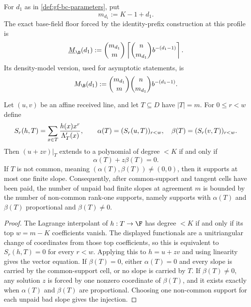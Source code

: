 \begin{definition}
\label{def:gf-bc-base-floor}
For \(d_1\) as in \cref{def:gf-bc-parameters}, put
\[
        m_{d_1}:=K-1+d_1 .
\]
The exact base-field floor forced by the identity-prefix construction at this
profile is
\[
        \underline M_{\B}(d_1)
        :=
        \binom{m_{d_1}}m
        \left\lceil \binom n{m_{d_1}} b^{-(d_1-1)}\right\rceil .
\]
Its density-model version, used for asymptotic statements, is
\[
        M_{\B}(d_1)
        :=
        \binom{m_{d_1}}m
        \binom n{m_{d_1}} b^{-(d_1-1)} .
\]
\end{definition}

\begin{proposition}
\label{prop:gf-bc-slope-elimination}
Let \((u,v)\) be an affine received line, and let \(T\subseteq D\) have
\(|T|=m\).  For \(0\le r<w\) define
\[
        S_r(h,T)=\sum_{x\in T}{h(x)x^r\over\Lambda_T'(x)},\qquad
        \alpha(T)=(S_r(u,T))_{r<w},\quad
        \beta(T)=(S_r(v,T))_{r<w}.
\]
Then \((u+zv)|_T\) extends to a polynomial of degree \(<K\) if and only if
\[
        \alpha(T)+z\beta(T)=0 .
\]
If \(T\) is not common, meaning \((\alpha(T),\beta(T))\ne(0,0)\), then it
supports at most one finite slope.  Consequently, after common-support and
tangent cells have been paid, the number of unpaid bad finite slopes at
agreement \(m\) is bounded by the number of non-common rank-one supports,
namely supports with \(\alpha(T)\) and \(\beta(T)\) proportional and
\(\beta(T)\ne0\).
\end{proposition}

\begin{proof}
The Lagrange interpolant of \(h:T\to\F\) has degree \(<K\) if and only if its
top \(w=m-K\) coefficients vanish.  The displayed functionals are a
unitriangular change of coordinates from those top coefficients, so this is
equivalent to \(S_r(h,T)=0\) for every \(r<w\).  Applying this to \(h=u+zv\)
and using linearity gives the vector equation.  If \(\beta(T)=0\), either
\(\alpha(T)=0\) and every slope is carried by the common-support cell, or no
slope is carried by \(T\).  If \(\beta(T)\ne0\), any solution \(z\) is forced
by one nonzero coordinate of \(\beta(T)\), and it exists exactly when
\(\alpha(T)\) and \(\beta(T)\) are proportional.  Choosing one non-common
support for each unpaid bad slope gives the injection.
\end{proof}

